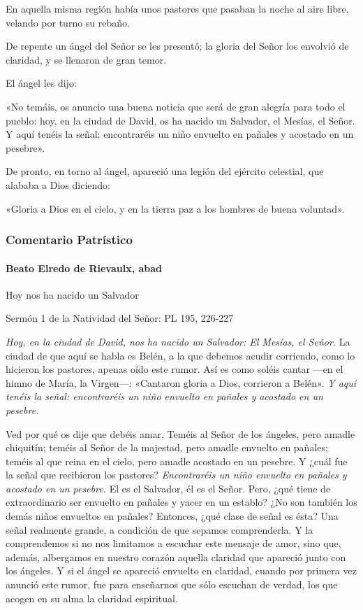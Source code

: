 \documentclass[]{article}
\let\oldparagraph\paragraph
\renewcommand{\paragraph}[1]{\oldparagraph{#1}\mbox{}}
\begin{document}
En aquella misma región había unos pastores que pasaban la noche al aire
libre, velando por turno su rebaño.

De repente un ángel del Señor se les presentó; la gloria del Señor los
envolvió de claridad, y se llenaron de gran temor.

El ángel les dijo:

«No temáis, os anuncio una buena noticia que será de gran alegría para
todo el pueblo: hoy, en la ciudad de David, os ha nacido un Salvador, el
Mesías, el Señor. Y aquí tenéis la señal: encontraréis un niño envuelto
en pañales y acostado en un pesebre».

De pronto, en torno al ángel, apareció una legión del ejército
celestial, que alababa a Dios diciendo:

«Gloria a Dios en el cielo, y en la tierra paz a los hombres de buena
voluntad».


\protect\hypertarget{_Toc448662779}{}{}

\subsubsection{Comentario Patrístico}\label{comentario-patruxedstico-5}

\paragraph{Beato Elredo de Rievaulx,
abad}\label{beato-elredo-de-rievaulx-abad}

Hoy nos ha nacido un Salvador

Sermón 1 de la Natividad del Señor: PL 195, 226-227

\emph{Hoy, en la ciudad de David, nos ha nacido un Salvador: El Mesías,
el Señor.} La ciudad de que aquí se habla es Belén, a la que debemos
acudir corriendo, como lo hicieron los pastores, apenas oído este rumor.
Así es como soléis cantar ---en el himno de María, la Virgen---:
«Cantaron gloria a Dios, corrieron a Belén». \emph{Y aquí tenéis la
señal: encontraréis un niño envuelto en pañales y acostado en un
pesebre.}

Ved por qué os dije que debéis amar. Teméis al Señor de los ángeles,
pero amadle chiquitín; teméis al Señor de la majestad, pero amadle
envuelto en pañales; teméis al que reina en el cielo, pero amadle
acostado en un pesebre. Y ¿cuál fue la señal que recibieron los
pastores? \emph{Encontraréis un niño envuelto en pañales y acostado en
un pesebre.} El es el Salvador, él es el Señor. Pero, ¿qué tiene de
extraordinario ser envuelto en pañales y yacer en un establo? ¿No son
también los demás niños envueltos en pañales? Entonces, ¿qué clase de
señal es ésta? Una señal realmente grande, a condición de que sepamos
comprenderla. Y la comprendemos si no nos limitamos a escuchar este
mensaje de amor, sino que, además, albergamos en nuestro corazón aquella
claridad que apareció junto con los ángeles. Y si el ángel se apareció
envuelto en claridad, cuando por primera vez anunció este rumor, fue
para enseñarnos que sólo escuchan de verdad, los que acogen en su alma
la claridad espiritual.
\end{document}
